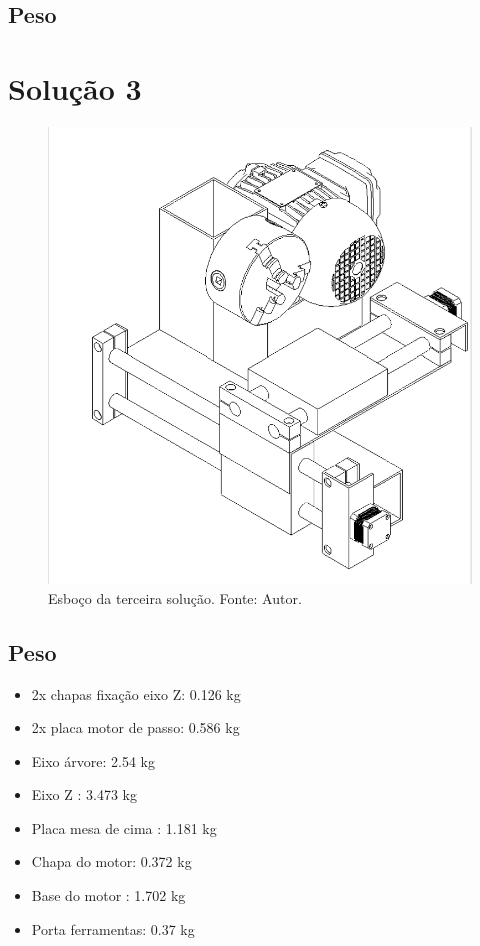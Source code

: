 \subsection{Peso} 


\section{Solução 3}
\begin{figure}[h!]
    \centering
    \includegraphics[width=0.7\linewidth]{images/sol3.png}
    \caption{Esboço da terceira solução. Fonte: Autor.}
    \label{fig:enter-label}
\end{figure}

\subsection{Peso}

\begin{itemize}
    \item 2x chapas fixação eixo Z: 0.126 kg
    \item 2x placa motor de passo: 0.586 kg
    \item Eixo árvore: 2.54 kg
    \item Eixo Z : 3.473 kg
    \item Placa mesa de cima : 1.181 kg
    \item Chapa do motor: 0.372 kg 
    \item Base do motor : 1.702 kg
    \item Porta ferramentas: 0.37 kg
\end{itemize}


